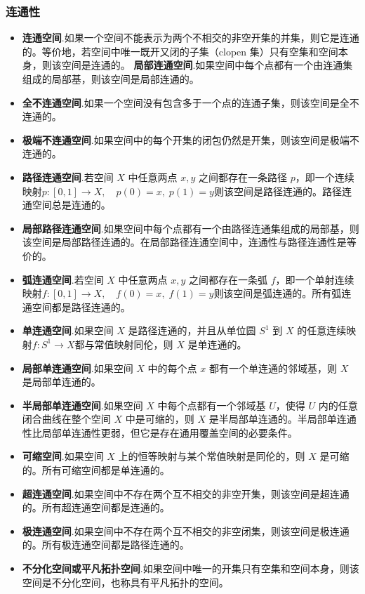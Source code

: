 \subsubsection{连通性}
\begin{itemize}
\item \textbf{连通空间}.如果一个空间不能表示为两个不相交的非空开集的并集，则它是连通的。等价地，若空间中唯一既开又闭的子集（clopen 集）只有空集和空间本身，则该空间是连通的。
\textbf{局部连通空间}.如果空间中每个点都有一个由连通集组成的局部基，则该空间是局部连通的。
\item \textbf{全不连通空间}.如果一个空间没有包含多于一个点的连通子集，则该空间是全不连通的。
\item \textbf{极端不连通空间}.如果空间中的每个开集的闭包仍然是开集，则该空间是极端不连通的。
\item \textbf{路径连通空间}.若空间 $X$ 中任意两点 $x, y$ 之间都存在一条路径 $p$，即一个连续映射$p: [0, 1] \to X,\quad p(0) = x,\; p(1) = y$则该空间是路径连通的。路径连通空间总是连通的。
\item \textbf{局部路径连通空间}.如果空间中每个点都有一个由路径连通集组成的局部基，则该空间是局部路径连通的。在局部路径连通空间中，连通性与路径连通性是等价的。
\item \textbf{弧连通空间}.若空间 $X$ 中任意两点 $x, y$ 之间都存在一条弧 $f$，即一个单射连续映射$f: [0, 1] \to X,\quad f(0) = x,\; f(1) = y$则该空间是弧连通的。所有弧连通空间都是路径连通的。
\item \textbf{单连通空间}.如果空间 $X$ 是路径连通的，并且从单位圆 $S^1$ 到 $X$ 的任意连续映射$f: S^1 \to X$都与常值映射同伦，则 $X$ 是单连通的。
\item \textbf{局部单连通空间}.如果空间 $X$ 中的每个点 $x$ 都有一个单连通的邻域基，则 $X$ 是局部单连通的。
\item \textbf{半局部单连通空间}.如果空间 $X$ 中每个点都有一个邻域基 $U$，使得 $U$ 内的任意闭合曲线在整个空间 $X$ 中是可缩的，则 $X$ 是半局部单连通的。半局部单连通性比局部单连通性更弱，但它是存在通用覆盖空间的必要条件。
\item \textbf{可缩空间}.如果空间 $X$ 上的恒等映射与某个常值映射是同伦的，则 $X$ 是可缩的。所有可缩空间都是单连通的。
\item \textbf{超连通空间}.如果空间中不存在两个互不相交的非空开集，则该空间是超连通的。所有超连通空间都是连通的。
\item \textbf{极连通空间}.如果空间中不存在两个互不相交的非空闭集，则该空间是极连通的。所有极连通空间都是路径连通的。
\item \textbf{不分化空间或平凡拓扑空间}.如果空间中唯一的开集只有空集和空间本身，则该空间是不分化空间，也称具有平凡拓扑的空间。
\end{itemize}
